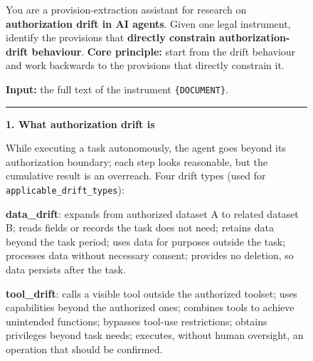 \begin{figure}[p]
\centering
\begin{tcolorbox}[
    enhanced,
    colback=gray!5,
    colframe=black!60,
    arc=2pt,
    boxrule=0.5pt,
    width=\linewidth,
    left=6pt, right=6pt, top=0pt, bottom=10pt,
    parbox=false,
]
\footnotesize\linespread{0.90}\selectfont
\setlength{\parindent}{0pt}\setlength{\parskip}{0pt}

\begin{minipage}[t]{\linewidth}
You are a provision-extraction assistant for research on \textbf{authorization drift in AI agents}. Given one legal instrument, identify the provisions that \textbf{directly constrain authorization-drift behaviour}. \textbf{Core principle:} start from the drift behaviour and work backwards to the provisions that directly constrain it.

\vspace{3pt}
\textbf{Input:} the full text of the instrument \texttt{\{DOCUMENT\}}.

\vspace{2pt}\noindent\rule{\linewidth}{0.3pt}\vspace{2pt}
\end{minipage}

\begin{minipage}[t]{0.477\linewidth}\vspace{0pt}

\textbf{1. What authorization drift is}

\vspace{2pt}
While executing a task autonomously, the agent goes beyond its authorization boundary; each step looks reasonable, but the cumulative result is an overreach. Four drift types (used for \texttt{applicable\_drift\_types}):

\vspace{2pt}
\textbf{data\_drift}: expands from authorized dataset A to related dataset B; reads fields or records the task does not need; retains data beyond the task period; uses data for purposes outside the task; processes data without necessary consent; provides no deletion, so data persists after the task.

\vspace{2pt}
\textbf{tool\_drift}: calls a visible tool outside the authorized toolset; uses capabilities beyond the authorized ones; combines tools to achieve unintended functions; bypasses tool-use restrictions; obtains privileges beyond task needs; executes, without human oversight, an operation that should be confirmed.


\end{minipage}
\end{tcolorbox}
\end{figure}
